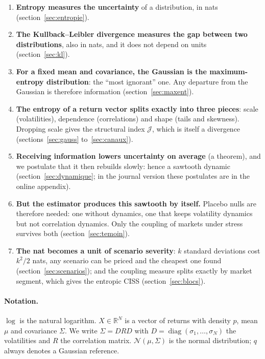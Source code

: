\documentclass[11pt]{article}
\theoremstyle{plain}
\theoremstyle{definition}
\theoremstyle{remark}
\newcommand{\JJ}{\mathcal{J}}
\newcommand{\R}{\mathbb{R}}
\newcommand{\N}{\mathcal{N}}
\begin{document}
\begin{enumerate}
\item \textbf{Entropy measures the uncertainty} of a distribution, in nats
(section~\ref{sec:entropie}).
\item \textbf{The Kullback--Leibler divergence measures the gap between two
distributions}, also in nats, and it does not depend on units
(section~\ref{sec:kl}).
\item \textbf{For a fixed mean and covariance, the Gaussian is the
maximum-entropy distribution}: the ``most ignorant'' one. Any departure from
the Gaussian is therefore information (section~\ref{sec:maxent}).
\item \textbf{The entropy of a return vector splits exactly into three
pieces}: scale (volatilities), dependence (correlations) and shape (tails and
skewness). Dropping scale gives the structural index $\JJ$, which is itself a
divergence (sections~\ref{sec:gauss} to~\ref{sec:canaux}).
\item \textbf{Receiving information lowers uncertainty on average}
(a theorem), and we postulate that it then rebuilds slowly: hence a sawtooth
dynamic (section~\ref{sec:dynamique}; in the journal version these
postulates are in the online appendix).
\item \textbf{But the estimator produces this sawtooth by itself.} Placebo
nulls are therefore needed: one without dynamics, one that keeps volatility
dynamics but not correlation dynamics. Only the coupling of markets under
stress survives both (section~\ref{sec:temoin}).
\item \textbf{The nat becomes a unit of scenario severity}: $k$ standard
deviations cost $k^2/2$ nats, any scenario can be priced and the cheapest one
found (section~\ref{sec:scenarios}); and the coupling measure splits exactly
by market segment, which gives the entropic CISS (section~\ref{sec:blocs}).
\end{enumerate}

\paragraph{Notation.} $\log$ is the natural logarithm. $X\in\R^N$ is a vector
of returns with density $p$, mean $\mu$ and covariance $\Sigma$. We write
$\Sigma=DRD$ with $D=\operatorname{diag}(\sigma_1,\dots,\sigma_N)$ the
volatilities and $R$ the correlation matrix. $\N(\mu,\Sigma)$ is the normal
distribution; $q$ always denotes a Gaussian reference.

\end{document}
